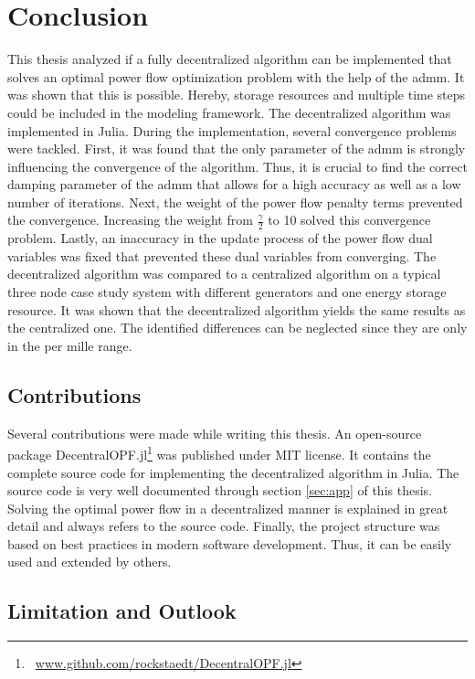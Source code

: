 \section{Conclusion}

This thesis analyzed if a fully decentralized algorithm can be implemented that solves an optimal power flow optimization problem with the help of the \gls{admm}. It was shown that this is possible. Hereby, storage resources and multiple time steps could be included in the modeling framework. The decentralized algorithm was implemented in Julia. During the implementation, several convergence problems were tackled. First, it was found that the only parameter of the \gls{admm} is strongly influencing the convergence of the algorithm. Thus, it is crucial to find the correct damping parameter of the \gls{admm} that allows for a high accuracy as well as a low number of iterations. Next, the weight of the power flow penalty terms prevented the convergence. Increasing the weight from $\frac{\gamma}{2}$ to 10 solved this convergence problem. Lastly, an inaccuracy in the update process of the power flow dual variables was fixed that prevented these dual variables from converging. The decentralized algorithm was compared to a centralized algorithm on a typical three node case study system with different generators and one energy storage resource. It was shown that the decentralized algorithm yields the same results as the centralized one. The identified differences can be neglected since they are only in the per mille range.

\subsection{Contributions}

Several contributions were made while writing this thesis. An open-source package DecentralOPF.jl\footnote{~\url{www.github.com/rockstaedt/DecentralOPF.jl}} was published under MIT license. It contains the complete source code for implementing the decentralized algorithm in Julia. The source code is very well documented through section \ref{sec:app} of this thesis. Solving the optimal power flow in a decentralized manner is explained in great detail and always refers to the source code. Finally, the project structure was based on best practices in modern software development. Thus, it can be easily used and extended by others.

\subsection{Limitation and Outlook}

